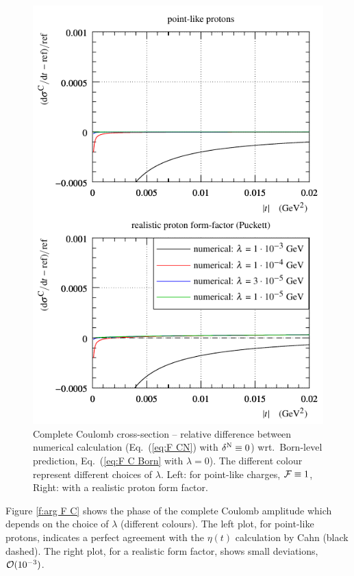 \documentclass[pdftex,twocolumn,epjc3]{svjour3}
\begin{document}
\begin{figure}[h]
\begin{center}
\includegraphics{fig/coul_complete_cmp_lambda_dsdt.pdf}
\caption{Complete Coulomb cross-section -- relative difference between numerical calculation (Eq.~(\ref{eq:F CN}) with $\delta^{\rm N} \equiv 0$) wrt.~Born-level prediction, Eq.~(\ref{eq:F C Born} with $\lambda = 0$). The different colour represent different choices of $\lambda$. Left: for point-like charges, ${\cal F} \equiv 1$, Right: with a realistic proton form factor.}
\label{f:sig C}
\end{center}
\end{figure}

Figure \ref{f:arg F C} shows the phase of the complete Coulomb amplitude which depends on the choice of $\lambda$ (different colours). The left plot, for point-like protons, indicates a perfect agreement with the $\eta(t)$ calculation by Cahn (black dashed). The right plot, for a realistic form factor, shows small deviations, ${\cal O}(10^{-3})$.
\end{document}
